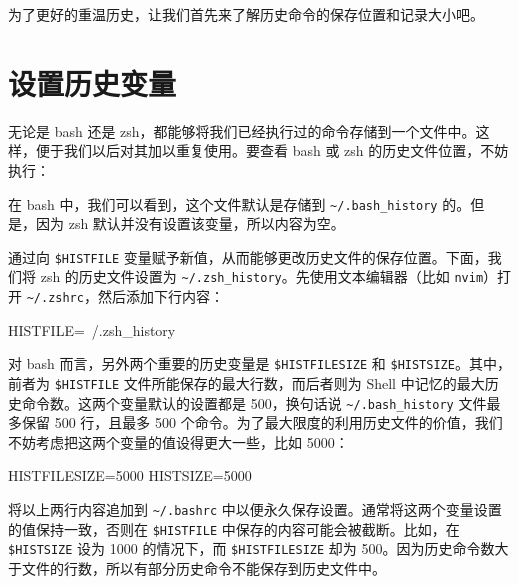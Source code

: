 \documentclass[]{ctexbook}
\newenvironment{Shaded}{\begin{snugshade}}{\end{snugshade}}
\newcommand{\ExtensionTok}[1]{#1}
\newcommand{\NormalTok}[1]{#1}
\newcommand{\VariableTok}[1]{\textcolor[rgb]{0.00,0.00,0.00}{#1}}
\begin{document}
为了更好的重温历史，让我们首先来了解历史命令的保存位置和记录大小吧。

\hypertarget{ux8bbeux7f6eux5386ux53f2ux53d8ux91cf}{%
\section{设置历史变量}\label{ux8bbeux7f6eux5386ux53f2ux53d8ux91cf}}

无论是 bash 还是 zsh，都能够将我们已经执行过的命令存储到一个文件中。这样，便于我们以后对其加以重复使用。要查看 bash 或 zsh 的历史文件位置，不妨执行：

\begin{Shaded}
\end{Shaded}

在 bash 中，我们可以看到，这个文件默认是存储到 \texttt{\textasciitilde{}/.bash\_history} 的。但是，因为 zsh 默认并没有设置该变量，所以内容为空。

通过向 \texttt{\$HISTFILE} 变量赋予新值，从而能够更改历史文件的保存位置。下面，我们将 zsh 的历史文件设置为 \texttt{\textasciitilde{}/.zsh\_history}。先使用文本编辑器（比如 \texttt{nvim}）打开 \texttt{\textasciitilde{}/.zshrc}，然后添加下行内容：

\begin{Shaded}
\begin{Highlighting}[]
\VariableTok{HISTFILE=}\NormalTok{~/.zsh_history}
\end{Highlighting}
\end{Shaded}

对 bash 而言，另外两个重要的历史变量是 \texttt{\$HISTFILESIZE} 和 \texttt{\$HISTSIZE}。其中，前者为 \texttt{\$HISTFILE} 文件所能保存的最大行数，而后者则为 Shell 中记忆的最大历史命令数。这两个变量默认的设置都是 500，换句话说 \texttt{\textasciitilde{}/.bash\_history} 文件最多保留 500 行，且最多 500 个命令。为了最大限度的利用历史文件的价值，我们不妨考虑把这两个变量的值设得更大一些，比如 5000：

\begin{Shaded}
\begin{Highlighting}[]
\VariableTok{HISTFILESIZE=}\NormalTok{5000}
\VariableTok{HISTSIZE=}\NormalTok{5000}
\end{Highlighting}
\end{Shaded}

将以上两行内容追加到 \texttt{\textasciitilde{}/.bashrc} 中以便永久保存设置。通常将这两个变量设置的值保持一致，否则在 \texttt{\$HISTFILE} 中保存的内容可能会被截断。比如，在 \texttt{\$HISTSIZE} 设为 1000 的情况下，而 \texttt{\$HISTFILESIZE} 却为 500。因为历史命令数大于文件的行数，所以有部分历史命令不能保存到历史文件中。
\end{document}
